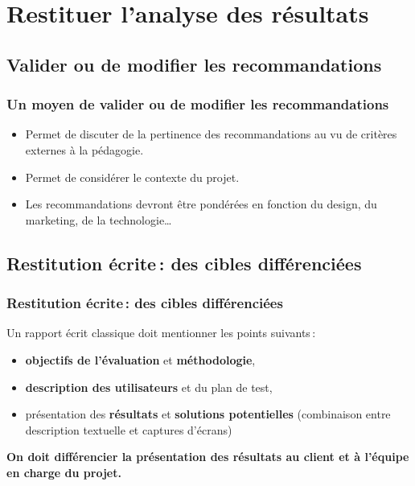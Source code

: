 \section{Restituer l'analyse des résultats} 	
\subsection{Valider ou de modifier les recommandations} 
		\begin{frame}[allowframebreaks]
		\frametitle{Un moyen de valider ou de modifier les recommandations \citep{ergolab2014a}}
			\begin {itemize}
				      \item Permet de discuter de la pertinence des recommandations au vu de critères externes à la pédagogie.
				      \item Permet de considérer le contexte du projet. 
				      \item Les recommandations devront être pondérées en fonction du design, du marketing, de la technologie… 
				      		
				\end{itemize}
		\end{frame}   
		
	
\subsection{Restitution écrite\,: des cibles différenciées} 
		\begin{frame}[allowframebreaks]
		\frametitle{Restitution écrite\,: des cibles différenciées \citep{ergolab2014a}}
			Un rapport écrit classique doit mentionner les points suivants\,:
			\begin {itemize}
				      \item\textbf{objectifs de l'évaluation} et \textbf{méthodologie},
				      \item \textbf{description des utilisateurs} et du plan de test,
				      \item présentation des \textbf{résultats} et \textbf{solutions potentielles} (combinaison entre description textuelle et captures d'écrans)


				      		
				\end{itemize}
				\textbf{On doit différencier la présentation des résultats au client et à l'équipe en charge du projet. }
		\end{frame}    	
	 	
